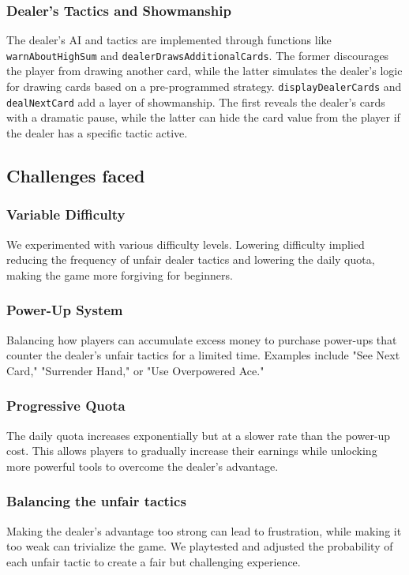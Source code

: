 \documentclass[9pt,a4paper,twoside]{tau-class/tau}
\begin{document}
    \subsubsection{Dealer's Tactics and Showmanship}  
    The dealer's AI and tactics are implemented through functions like \texttt{warnAboutHighSum} and \texttt{dealerDrawsAdditionalCards}. The former discourages the player from drawing another card, while the latter simulates the dealer's logic for drawing cards based on a pre-programmed strategy. \texttt{displayDealerCards} and \texttt{dealNextCard} add a layer of showmanship. The first reveals the dealer's cards with a dramatic pause, while the latter can hide the card value from the player if the dealer has a specific tactic active.
    
    \subsection{Challenges faced} 
  
    \subsubsection{Variable Difficulty}
    We experimented with various difficulty levels. Lowering difficulty implied reducing the frequency of unfair dealer tactics and lowering the daily quota, making the game more forgiving for beginners. 
    
    \subsubsection{Power-Up System} 
    Balancing how players can accumulate excess money to purchase power-ups that counter the dealer's unfair tactics for a limited time. Examples include "See Next Card," "Surrender Hand," or "Use Overpowered Ace." 
    
    \subsubsection{Progressive Quota}
    The daily quota increases exponentially but at a slower rate than the power-up cost. This allows players to gradually increase their earnings while unlocking more powerful tools to overcome the dealer's advantage. 
    
    \subsubsection{Balancing the unfair tactics} 
    Making the dealer's advantage too strong can lead to frustration, while making it too weak can trivialize the game. We playtested and adjusted the probability of each unfair tactic to create a fair but challenging experience. 
    
\end{document}
